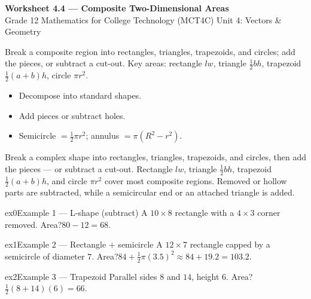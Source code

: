 \documentclass[11pt]{article}
\begin{document}
\begin{center}
{\LARGE\bfseries\color{titleblue}Worksheet 4.4 --- Composite Two-Dimensional Areas}\\[2pt]
{\small Grade 12 Mathematics for College Technology (MCT4C) \textperiodcentered{} Unit 4: Vectors \& Geometry}
\end{center}

\begin{ideabox}
Break a composite region into rectangles, triangles, trapezoids, and circles; add the pieces, or subtract a cut-out. Key areas: rectangle $lw$, triangle $\tfrac12bh$, trapezoid $\tfrac12(a+b)h$, circle $\pi r^2$.
\begin{itemize}[leftmargin=*,itemsep=2pt]
  \item Decompose into standard shapes.
  \item Add pieces or subtract holes.
  \item Semicircle $=\tfrac12\pi r^2$; annulus $=\pi(R^2-r^2)$.
\end{itemize}
\end{ideabox}

\begin{learnbox}
Break a complex shape into rectangles, triangles, trapezoids, and circles, then add the pieces — or subtract a cut-out.
Rectangle $lw$, triangle $\tfrac12bh$, trapezoid $\tfrac12(a+b)h$, and circle $\pi r^2$ cover most composite regions.
Removed or hollow parts are subtracted, while a semicircular end or an attached triangle is added.
\end{learnbox}


\begin{example}{ex0}{Example 1 --- L-shape (subtract)}
A $10\times8$ rectangle with a $4\times3$ corner removed. Area?\soln $80-12=68$.
\end{example}

\begin{example}{ex1}{Example 2 --- Rectangle + semicircle}
A $12\times7$ rectangle capped by a semicircle of diameter $7$. Area?\soln $84+\tfrac12\pi(3.5)^2\approx84+19.2=103.2$.
\end{example}

\begin{example}{ex2}{Example 3 --- Trapezoid}
Parallel sides $8$ and $14$, height $6$. Area?\soln $\tfrac12(8+14)(6)=66$.
\end{example}
\end{document}
